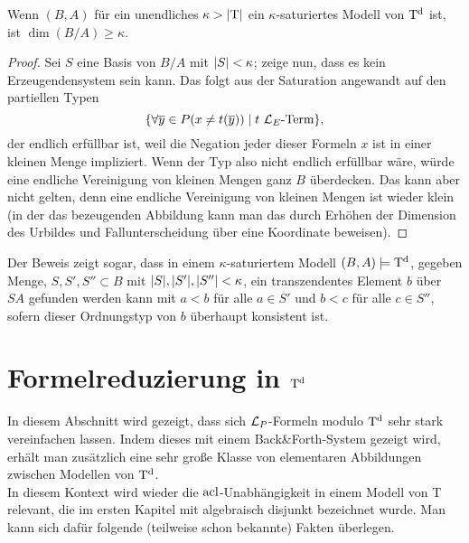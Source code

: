 \begin{lemma}
	Wenn $(B,A)$ für ein unendliches $\kappa>{\left| \operatorname{T} \right|}$ ein $\kappa$-saturiertes Modell von $\operatorname{T^d}$ ist, ist $\dim(B/A)\geq\kappa$.
\end{lemma}
\begin{proof}
	Sei $S$ eine Basis von $B/A$ mit ${\left| S \right|}<\kappa$; zeige nun, dass es kein Erzeugendensystem sein kann. Das folgt aus der Saturation angewandt auf den partiellen Typen $$\{\forall\overline{y}\in P(x\neq t(\overline{y}))\mid t\ \mathcal{L}_E\text{-Term}\},$$ der endlich erfüllbar ist, weil die Negation jeder dieser Formeln \glqq{}$x$ ist in einer kleinen Menge\grqq{} impliziert. Wenn der Typ also nicht endlich erfüllbar wäre, würde eine endliche Vereinigung von kleinen Mengen ganz $B$ überdecken. Das kann aber nicht gelten, denn eine endliche Vereinigung von kleinen Mengen ist wieder klein (in der das bezeugenden Abbildung kann man das durch Erhöhen der Dimension des Urbildes und Fallunterscheidung über eine Koordinate beweisen).
\end{proof}
\begin{corollary}\label{Finden transz Elte}
	Der Beweis zeigt sogar, dass in einem $\kappa$-saturiertem Modell $(B,A)\models\operatorname{T^d}$, gegeben Menge, $S,S',S''\subset B$ mit ${\left| S \right|},{\left| S' \right|},{\left| S'' \right|}<\kappa$, ein transzendentes Element $b$ über $SA$ gefunden werden kann mit $a<b$ für alle $a\in S'$ und $b<c$ für alle $c\in S''$, sofern dieser Ordnungstyp von $b$ überhaupt konsistent ist.
\end{corollary}

\section{Formelreduzierung in $\operatorname{T^d}$}
In diesem Abschnitt wird gezeigt, dass sich $\mathcal{L}_P$-Formeln modulo $\operatorname{T^d}$ sehr stark vereinfachen lassen. Indem dieses mit einem Back\&Forth-System gezeigt wird, erhält man zusätzlich eine sehr große Klasse von elementaren Abbildungen zwischen Modellen von $\operatorname{T^d}$.\\
In diesem Kontext wird wieder die $\operatorname{acl}$-Unabhängigkeit in einem Modell von T relevant, die im ersten Kapitel mit \glqq{}algebraisch disjunkt\grqq{} bezeichnet wurde. Man kann sich dafür folgende (teilweise schon bekannte) Fakten überlegen.

